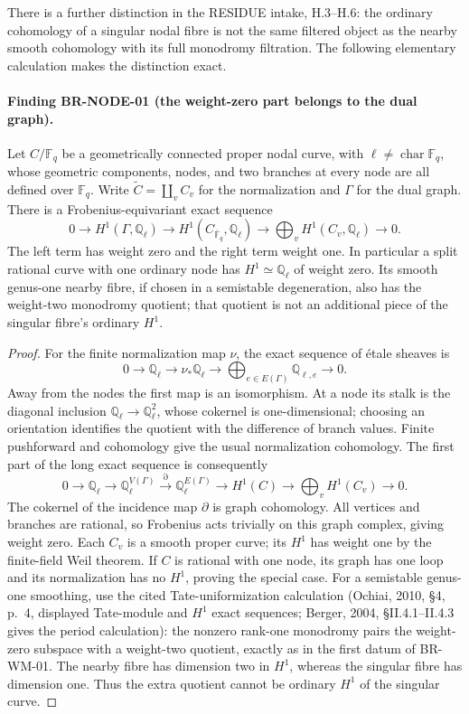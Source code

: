 \documentclass[11pt,a4paper]{article}
\theoremstyle{definition}\newtheorem{definition}[theorem]{Definition}
\theoremstyle{remark}\newtheorem{remark}[theorem]{Remark}
\begin{document}
There is a further distinction in the RESIDUE intake, H.3--H.6:
the ordinary cohomology of a singular nodal fibre is not the same
filtered object as the nearby smooth cohomology with its full
monodromy filtration.  The following elementary calculation makes
the distinction exact.

\paragraph{Finding BR-NODE-01 (the weight-zero part belongs to the dual graph).}
Let $C/\mathbb F_q$ be a geometrically connected proper nodal curve,
with $\ell\ne\operatorname{char}\mathbb F_q$, whose geometric
components, nodes, and two branches at every node are all defined over
$\mathbb F_q$.  Write $\widetilde C=\coprod_v C_v$ for the
normalization and $\Gamma$ for the dual graph.  There is a
Frobenius-equivariant exact sequence
\[
 0\longrightarrow H^1(\Gamma,\mathbb Q_\ell)
 \longrightarrow H^1(C_{\overline{\mathbb F}_q},\mathbb Q_\ell)
 \longrightarrow\bigoplus_vH^1(C_v,\mathbb Q_\ell)
 \longrightarrow0.
\]
The left term has weight zero and the right term weight one.
In particular a split rational curve with one ordinary node has
$H^1\simeq\mathbb Q_\ell$ of weight zero.  Its smooth genus-one
nearby fibre, if chosen in a semistable degeneration, also has the
weight-two monodromy quotient; that quotient is not an additional
piece of the singular fibre's ordinary $H^1$.

\begin{proof}
For the finite normalization map $\nu$, the exact sequence of
\'etale sheaves is
\[
 0\longrightarrow\mathbb Q_\ell
 \longrightarrow\nu_*\mathbb Q_\ell
 \longrightarrow\bigoplus_{e\in E(\Gamma)}\mathbb Q_{\ell,e}
 \longrightarrow0.
\]
Away from the nodes the first map is an isomorphism.  At a node
its stalk is the diagonal inclusion $\mathbb Q_\ell\to
\mathbb Q_\ell^2$, whose cokernel is one-dimensional; choosing
an orientation identifies the quotient with the difference of
branch values.  Finite pushforward and cohomology give the usual
normalization cohomology.  The first part of the long exact
sequence is consequently
\[
 0\to\mathbb Q_\ell\to\mathbb Q_\ell^{V(\Gamma)}
 \xrightarrow{\partial}\mathbb Q_\ell^{E(\Gamma)}
 \to H^1(C)\to\bigoplus_vH^1(C_v)\to0.
\]
The cokernel of the incidence map $\partial$ is graph cohomology.
All vertices and branches are rational, so Frobenius acts trivially
on this graph complex, giving weight zero.  Each $C_v$ is a smooth
proper curve; its $H^1$ has weight one by the finite-field Weil
theorem.  If $C$ is rational with one node, its graph has one
loop and its normalization has no $H^1$, proving the special case.
For a semistable genus-one smoothing, use the cited Tate-uniformization
calculation (Ochiai, 2010, \S4, p.~4, displayed Tate-module and
$H^1$ exact sequences; Berger, 2004, \S II.4.1--II.4.3 gives the
period calculation): the nonzero rank-one monodromy pairs the
weight-zero subspace with a weight-two quotient, exactly as in the
first datum of BR-WM-01.
The nearby fibre has dimension two in $H^1$, whereas the singular
fibre has dimension one.  Thus the extra quotient cannot be
ordinary $H^1$ of the singular curve.
\end{proof}
\end{document}

